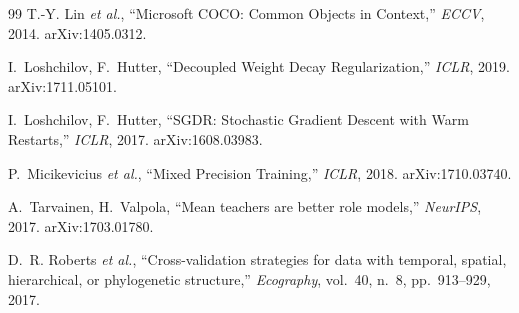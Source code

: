 \documentclass[11pt,a4paper]{article}
\begin{document}
\begin{thebibliography}{99}
T.-Y. Lin \emph{et al.},
\newblock ``Microsoft COCO: Common Objects in Context,''
\newblock \emph{ECCV}, 2014. arXiv:1405.0312.

I.~Loshchilov, F.~Hutter,
\newblock ``Decoupled Weight Decay Regularization,''
\newblock \emph{ICLR}, 2019. arXiv:1711.05101.

I.~Loshchilov, F.~Hutter,
\newblock ``SGDR: Stochastic Gradient Descent with Warm Restarts,''
\newblock \emph{ICLR}, 2017. arXiv:1608.03983.

P.~Micikevicius \emph{et al.},
\newblock ``Mixed Precision Training,''
\newblock \emph{ICLR}, 2018. arXiv:1710.03740.

A.~Tarvainen, H.~Valpola,
\newblock ``Mean teachers are better role models,''
\newblock \emph{NeurIPS}, 2017. arXiv:1703.01780.

D.~R. Roberts \emph{et al.},
\newblock ``Cross-validation strategies for data with temporal, spatial,
hierarchical, or phylogenetic structure,''
\newblock \emph{Ecography}, vol.~40, n.~8, pp.~913--929, 2017.

\end{thebibliography}
\end{document}
